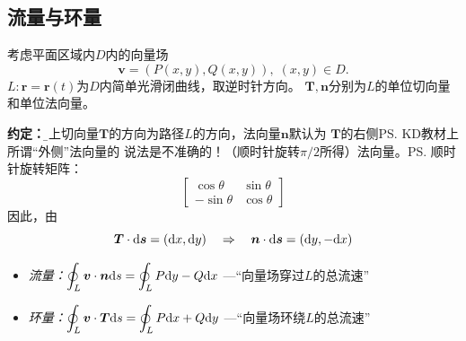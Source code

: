 % 

\subsection{流量与环量}

考虑平面区域内$D$内的向量场
$$\bm{v}=(P(x,y),Q(x,y)),\;(x,y)\in D.$$
$L:\bm{r}=\bm{r}(t)$为$D$内简单光滑闭曲线，取逆时针方向。
$\bm{T},\bm{n}$分别为$L$的单位切向量和单位法向量。

{\bf 约定：}{\b 以上切向量$\bm{T}$的方向为路径$L$的方向，法向量$\bm{n}$默认为
$\bm{T}$的右侧\ps{KD教材上所谓“外侧”法向量的
说法是不准确的！}（顺时针旋转$\pi/2$所得）法向量。}\ps{顺时针旋转矩阵：
$$\left[\begin{array}{cc}
	\cos\theta & \sin\theta \\ -\sin\theta & \cos\theta
\end{array}\right]$$
}因此，由
$$\bm{T}\cdot\mathrm{d}\bm{s}=(\mathrm{d} x, \mathrm{d} y)\quad\Rightarrow
\quad\bm{n}\cdot\mathrm{d}\bm{s}=(\mathrm{d} y,-\mathrm{d} x)$$

\begin{itemize}
  \item {\it 流量：}$\displaystyle\oint_L\bm{v}\cdot\bm{n}\mathrm{d} s=\oint_LP\mathrm{d} y-Q\mathrm{d} x$
  {\;—“向量场穿过$L$的总流速”}
  \item {\it 环量：}$\displaystyle\oint_L\bm{v}\cdot\bm{T}\mathrm{d} s=\oint_LP\mathrm{d} x+Q\mathrm{d} y$
  {\;—“向量场环绕$L$的总流速”}
\end{itemize}

